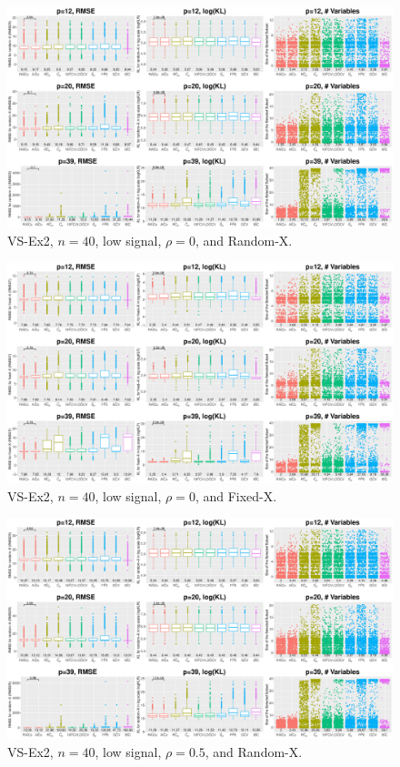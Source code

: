\clearpage
\begin{figure}[!ht]
\centering
\includegraphics[width=\textwidth]{figures/supplement/randomx_VS-Ex2_n40_lsnr_rho0.eps}
\caption{VS-Ex2, $n=40$, low signal, $\rho=0$, and Random-X.}
\end{figure}
\begin{figure}[!ht]
\centering
\includegraphics[width=\textwidth]{figures/supplement/fixedx_VS-Ex2_n40_lsnr_rho0.eps}
\caption{VS-Ex2, $n=40$, low signal, $\rho=0$, and Fixed-X.}
\end{figure}
\clearpage
\begin{figure}[!ht]
\centering
\includegraphics[width=\textwidth]{figures/supplement/randomx_VS-Ex2_n40_lsnr_rho05.eps}
\caption{VS-Ex2, $n=40$, low signal, $\rho=0.5$, and Random-X.}
\end{figure}
